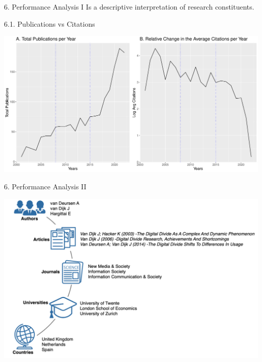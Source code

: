 \documentclass[
  ignorenonframetext,
]{beamer}
\begin{document}
\begin{frame}{6. Performance Analysis I}
\protect\hypertarget{performance-analysis-i}{}
Is a descriptive interpretation of research constituents.

\begin{block}{6.1. Publications vs Citations}
\protect\hypertarget{publications-vs-citations}{}
\vspace{0.5cm}

\includegraphics{Presentation_bibliometric_Madrid_june_20_files/figure-beamer/Panel cite vs prod-1.pdf}
\end{block}
\end{frame}

\begin{frame}{6. Performance Analysis II}
\protect\hypertarget{performance-analysis-ii}{}
\vspace{0.5cm}

\begin{center}
\includegraphics[width=1\textwidth]{pic_2.png}
\end{center}
\end{frame}
\end{document}
